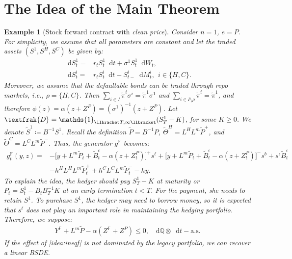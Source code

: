 \documentclass[a4paper, 11pt]{article}              %
\numberwithin{equation}{section}
\theoremstyle{plain}
\newcommand{\dqdt}{\df \dsQ \otimes \df t-\text{a.s}}
\newcommand{\1}{\mathds{1}}
\newcommand{\frD}{\textfrak{D}}
\newcommand{\Bt}{\tilde{B}}
\newcommand{\St}{\tilde{S}}
\newcommand{\pt}{\tilde{P}}
\newcommand{\pit}{\tilde{\pi}}
\newcommand{\dsF}{\mathbb{F}}
\newcommand{\dsQ}{\mathbb{Q}}
\newcommand{\Jt}{\tilde{\Theta}}
\theoremstyle{plain}
\theoremstyle{definition}
\newtheorem{example}[thm]{Example}
\theoremstyle{plain}
\newtheorem{example}{Example}
\newcommand*\df{\mathop{}\!\mathrm{d}}
\begin{document}
\section{The Idea of the Main Theorem}
\label{sec:idea}
\begin{example}[Stock forward contract with \textit{clean price}]\label{example:idea}
  Consider $n=1$, $e=P$. For simplicity, we assume that all parameters are
  constant and let the traded assets
  $(S^1, S^H, S^C)$ be given by:
\begin{align}
\df S^1_t =& r_tS^1_t \df t + \sigma^1S^1_t\df W_t, \nonumber \\
  \df S^i_t =& r_tS^i_t \df t -S^i_{t-}\df M^i_t, ~~i \in \{H, C\}. \nonumber 
\end{align}
Moreover, we assume that the defaultable bonds can be traded through repo markets,
i.e., $\rho =\{H, C\}$. Then $\sum_{i \in I}\pit^i \sigma^i = \pit^1\sigma^1$ and $\sum_{i \in
  I\setminus\rho}\pit^i = \pit^1$, and therefore
 $\phi(z) = \alpha(z+Z^P) = (\sigma^1)^{-1}(z+Z^P)$. 
Let $\frD = \1_{\llbracket T, \infty\llbracket}(S^1_T - K)$, for some
$K\geq0$. We denote $\St^1 \coloneqq B^{-1}S^1$. 
Recall the definition $\pt = B^{-1}P$, 
$\Jt^{  H}  = L^HL^m  \pt^+$, and 
 $\Jt^{  C}  = L^CL^m  \pt^-$.
Thus, the generator $g^\dsF$ becomes:
\begin{align}
  g^\dsF_t(y, z) =
  & -\big[y +L^m\pt_t+\Bt^\epsilon_t-\alpha(z+Z^P_t)\big]^+s^{\ell}
    + \big[y +L^m\pt_t+\Bt^\epsilon_t-\alpha(z+Z^P_t)\big]^-s^{b}+s^\epsilon\Bt^\epsilon_t\nonumber\\
  &-h^HL^HL^m \pt^+_t
    +h^CL^CL^m \pt^-_t -hy. \nonumber 
\end{align}
To explain the idea, the hedger should pay $S^1_T-K$ at maturity or
$P_t = S_t^1 -B_tB_T^{-1}K$ at an early termination $t < T$. For the payment, she
needs to retain $S^1$. To purchase $S^1$, the hedger may need to borrow money, so it
is expected that $s^\ell$ does not play an important role in maintaining the
hedging portfolio. Therefore, we suppose:
\begin{align}
  Y^\dsF +L^m\pt- \alpha(Z^\dsF +Z^P) \leq 0, ~~\dqdt. \label{idea:ineqf}
\end{align}
If the effect of \cref{idea:ineqf} is not dominated by the \textit{legacy
  portfolio}, we can recover a linear BSDE. 


\end{example}
\end{document}
